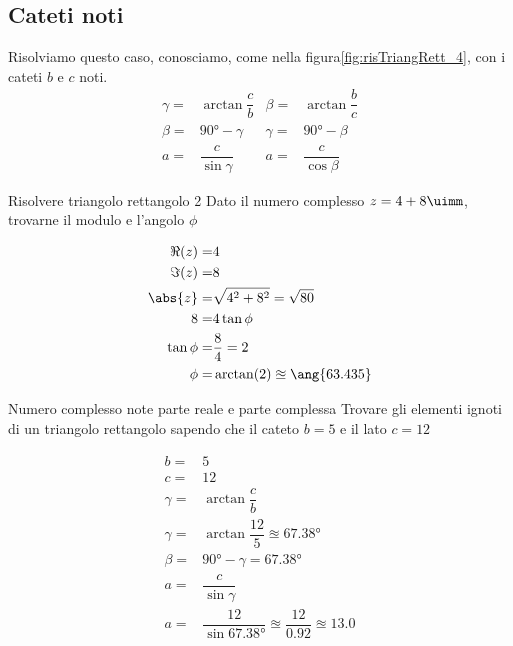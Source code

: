 \subsection{Cateti noti}
Risolviamo questo caso, conosciamo, come nella figura\nobs\vref{fig:risTriangRett_4}, con i cateti $b$ e $c$ noti.
\begin{align*}
\gamma=&\arctan\dfrac{c}{b}&\beta=&\arctan\dfrac{b}{c}\\
\beta=&\ang{90}-\gamma&\gamma=&\ang{90}-\beta\\
a=&\dfrac{c}{\sin\gamma}&a=&\dfrac{c}{\cos\beta}
\end{align*}
\begin{esempiot}{Risolvere triangolo rettangolo 2}{}
Dato il numero complesso $z=4+8\uimm$, trovarne il modulo e l'angolo $\phi$
\end{esempiot}
\begin{align*}
\Re(z)=&4\\
\Im(z)=&8\\
\abs{z}=&\sqrt{4^2+8^2}=\sqrt{80}\\
8=&4\tan\phi\\
\tan\phi=&\dfrac{8}{4}=2\\
\phi=&\arctan(2)\approxeq\ang{63.435}\\
\end{align*}
\begin{esempiot}{Numero complesso note parte reale e parte complessa}{}
	Trovare gli elementi ignoti di un triangolo rettangolo sapendo che  il cateto $b=5$ e il lato $c=12$
\end{esempiot}
\begin{align*}
b=&5\\
c=&12\\
\gamma=&\arctan\dfrac{c}{b}\\
\gamma=&\arctan\dfrac{12}{5}\approxeq\ang{67.38}\\
\beta=&\ang{90}-\gamma=\ang{67.38}\\
a=&\dfrac{c}{\sin\gamma}\\
a=&\dfrac{12}{\sin\ang{67.38}}\approxeq\dfrac{12}{\num{0.92}}\approxeq\num{13.0}
\end{align*}
